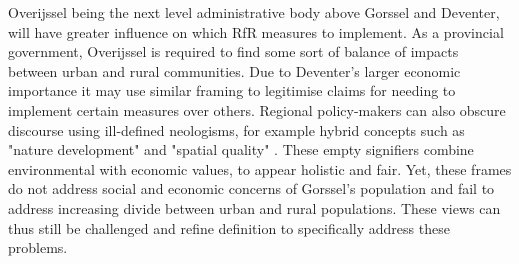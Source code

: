 Overijssel being the next level administrative body above Gorssel and Deventer, will have greater influence on which RfR measures to implement. As a provincial government, Overijssel is required to find some sort of balance of impacts between urban and rural communities. Due to Deventer's larger economic importance it may use similar framing to legitimise claims for needing to implement certain measures over others. Regional policy-makers can also obscure discourse using ill-defined neologisms, for example hybrid concepts such as "nature development" and "spatial quality" \parencite{warner_implementing_2011}. These empty signifiers combine environmental with economic values, to appear holistic and fair. Yet, these frames do not address social and economic concerns of Gorssel's population and fail to address increasing divide between urban and rural populations. These views can thus still be challenged and refine definition to specifically address these problems.
 